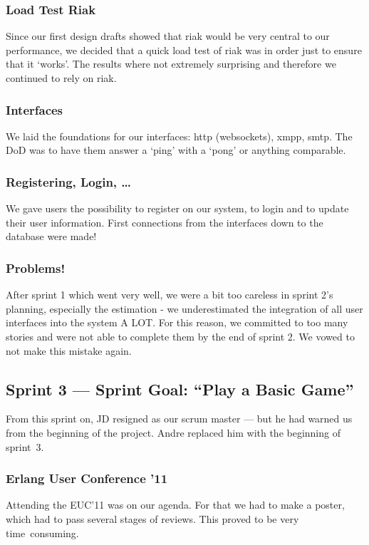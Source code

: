 \documentclass[11pt,a4paper]{report}
\begin{document}
\subsubsection{Load Test Riak}
Since our first design drafts showed that riak would be very central to our
performance, we decided that a quick load test of riak was in order just to
ensure that it `works'. The results where not extremely surprising and therefore
we continued to rely on riak.

\subsubsection{Interfaces}
We laid the foundations for our interfaces: http (websockets), xmpp, smtp.
The DoD was to have them answer a `ping' with a `pong' or anything comparable.

\subsubsection{Registering, Login, \ldots}
We gave users the possibility to register on our system, to login and to update
their user information. First connections from the interfaces down to the
database were made!

\subsubsection{Problems!}
After sprint 1 which went very well, we were a bit too careless in sprint 2's
planning, especially the estimation - we underestimated the integration of
all user interfaces into the system A LOT.
For this reason, we committed to too many stories and were not able to complete
them by the end of sprint 2. We vowed to not make this mistake again.

\subsection*{Sprint 3 --- Sprint Goal: ``Play a Basic Game''}
From this sprint on, JD resigned as our scrum master --- but he had warned us
from the beginning of the project. Andre replaced him with the beginning of
sprint~3.

\subsubsection{Erlang User Conference '11}

Attending the EUC'11 was on our agenda. For that we had to make a
poster, which had to pass several stages of reviews. This proved to be very
time~consuming.
\end{document}
